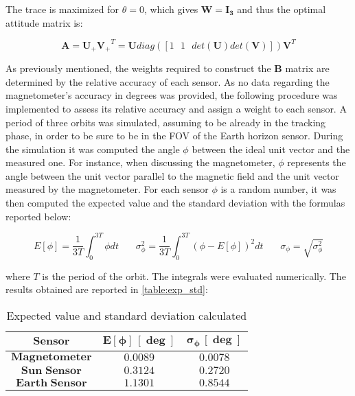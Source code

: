 The trace is maximized for $\theta=0$, which gives $\boldsymbol{W}=\boldsymbol{I_3}$ and thus the optimal attitude matrix is:

\begin{equation}
    \boldsymbol{A}=\boldsymbol{U_{+}V_{+}}^T=\boldsymbol{U}diag([1 \  \ \ 1 \ \ \ det(\boldsymbol{U})det(\boldsymbol{V})])\boldsymbol{V}^T
\end{equation}

As previously mentioned, the weights required to construct the $\boldsymbol{B}$ matrix are determined by the relative accuracy of each sensor. As no data regarding the magnetometer's accuracy in degrees was provided, the following procedure was implemented to assess its relative accuracy and assign a weight to each sensor.
A period of three orbits was simulated, assuming to be already in the tracking phase, in order to be sure to be in the FOV of the Earth horizon sensor. During the simulation it was computed the angle $\phi$ between the ideal unit vector and the measured one. For instance, when discussing the magnetometer, $\phi$ represents the angle between the unit vector parallel to the magnetic field and the unit vector measured by the magnetometer. For each sensor $\phi$ is a random number, it was then computed the expected value and the standard deviation with the formulas reported below:

\begin{equation}
    E[\phi]=\frac{1}{3T}\int_{0}^{3T}\phi dt \ \ \ \  \ \ \ \ \sigma_{\phi}^2=\frac{1}{3T}\int_{0}^{3T}(\phi - E[\phi])^2 dt \ \ \ \ \ \ \ \ \sigma_{\phi}=\sqrt{\sigma_{\phi}^2}
\end{equation}

where $T$ is the period of the orbit. The integrals were evaluated numerically. The results obtained are reported in \autoref{table:exp_std}:

\begin{table}[H]

    \centering
    \begin{tabular}{|c|c|c|}
    \hline
    $\bm{Sensor}$ & $\bm{E\left[\phi\right]\, [\deg]}$ & $\bm{\sigma_{\phi} \, [\deg]}$ \\
    \hline
    $\bm{Magnetometer}$ & $0.0089$ & $0.0078$  \\
    \hline
    $\bm{Sun\;Sensor}$ & $0.3124$ & $0.2720$  \\
    \hline
    $\bm{Earth\;Sensor}$ & $1.1301$ & $0.8544$  \\
    \hline
    \end{tabular}
    
    \caption{Expected value and standard deviation calculated}
    \label{table:exp_std}
    
\end{table}

